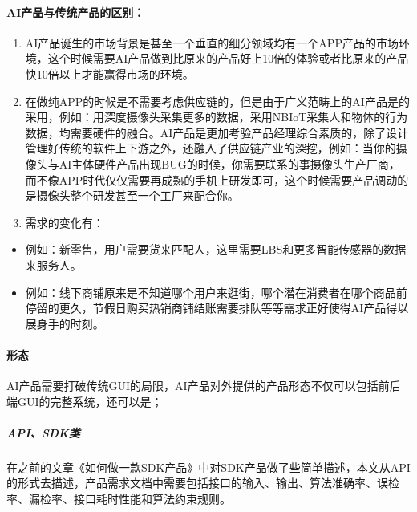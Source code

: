 \documentclass[letterpaper,10pt,english]{sphinxmanual}
\begin{document}
\paragraph{AI产品与传统产品的区别：}
\label{\detokenize{chapter_introduction/AI_Product:id2}}\begin{enumerate}
%
\item {} 
AI产品诞生的市场背景是甚至一个垂直的细分领域均有一个APP产品的市场环境，这个时候需要AI产品做到比原来的产品好上10倍的体验或者比原来的产品快10倍以上才能赢得市场的环境。

\item {} 
在做纯APP的时候是不需要考虑供应链的，但是由于广义范畴上的AI产品是的采用，例如：用深度摄像头采集更多的数据，采用NB\sphinxhyphen{}IoT采集人和物体的行为数据，均需要硬件的融合。AI产品是更加考验产品经理综合素质的，除了设计管理好传统的软件上下游之外，还融入了供应链产业的深挖，例如：当你的摄像头与AI主体硬件产品出现BUG的时候，你需要联系的事摄像头生产厂商，而不像APP时代仅仅需要再成熟的手机上研发即可，这个时候需要产品调动的是摄像头整个研发甚至一个工厂来配合你。

\item {} 
需求的变化有：

\end{enumerate}
\begin{itemize}
\item {} 
例如：新零售，用户需要货来匹配人，这里需要LBS和更多智能传感器的数据来服务人。

\item {} 
例如：线下商铺原来是不知道哪个用户来逛街，哪个潜在消费者在哪个商品前停留的更久，节假日购买热销商铺结账需要排队等等需求正好使得AI产品得以展身手的时刻。

\end{itemize}


\paragraph{形态}
\label{\detokenize{chapter_introduction/AI_Product:id3}}
AI产品需要打破传统GUI的局限，AI产品对外提供的产品形态不仅可以包括前后端GUI的完整系统，还可以是；


\subparagraph{API、SDK类}
\label{\detokenize{chapter_introduction/AI_Product:apisdk}}
在之前的文章《如何做一款SDK产品》中对SDK产品做了些简单描述，本文从API的形式去描述，产品需求文档中需要包括接口的输入、输出、算法准确率、误检率、漏检率、接口耗时性能和算法约束规则。
\end{document}
